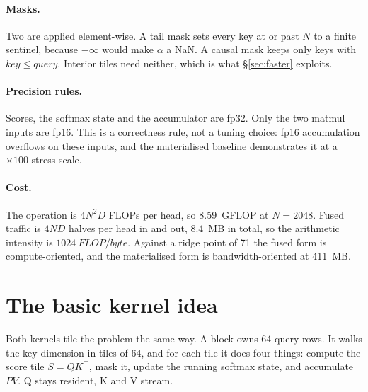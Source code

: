 \documentclass[10pt,a4paper]{article}
\begin{document}
\paragraph{Masks.} Two are applied element-wise. A tail mask sets every key at or past $N$ to a finite
sentinel, because $-\infty$ would make $\alpha$ a NaN. A causal mask keeps only keys with
$\mathit{key} \le \mathit{query}$. Interior tiles need neither, which is what \S\ref{sec:faster}
exploits.

\paragraph{Precision rules.} Scores, the softmax state and the accumulator are fp32. Only the two
matmul inputs are fp16. This is a correctness rule, not a tuning choice: fp16 accumulation overflows
on these inputs, and the materialised baseline demonstrates it at a $\times100$ stress scale.

\paragraph{Cost.} The operation is $4N^2D$ FLOPs per head, so \SI{8.59}{GFLOP} at $N{=}2048$. Fused
traffic is $4ND$ halves per head in and out, \SI{8.4}{MB} in total, so the arithmetic intensity is
$\SI{1024}{FLOP/byte}$. Against a ridge point of 71 the fused form is compute-oriented, and the
materialised form is bandwidth-oriented at \SI{411}{MB}.

\section{The basic kernel idea}

Both kernels tile the problem the same way. A block owns 64 query rows. It walks the key dimension in
tiles of 64, and for each tile it does four things: compute the score tile $S = QK^{\top}$, mask it,
update the running softmax state, and accumulate $P V$. Q stays resident, K and V stream.
\end{document}
